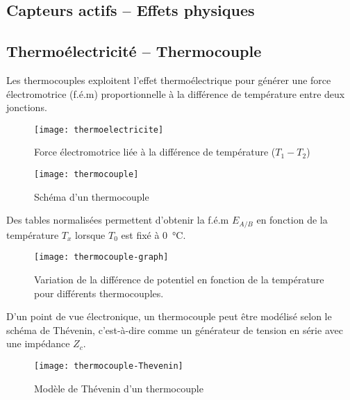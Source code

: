 \subsection*{Capteurs actifs – Effets physiques}

\subsection*{Thermoélectricité – Thermocouple}
Les thermocouples exploitent l'effet thermoélectrique pour générer une force 
électromotrice (f.é.m) proportionnelle à la différence de température entre deux 
jonctions.  

\begin{minipage}{0.49\textwidth}
    \begin{figure}[H]
        \centering
        \texttt{[image: thermoelectricite]}
        \caption{Force électromotrice liée à la différence de température (\(T_1-T_2\))}
        \label{figThermoelectricite}
    \end{figure}
\end{minipage}
\begin{minipage}{0.5\textwidth}
    \begin{figure}[H]
        \centering
        \texttt{[image: thermocouple]}
        \caption{Schéma d'un thermocouple}
        \label{figThermocouple}
    \end{figure}
\end{minipage}

Des tables normalisées permettent d'obtenir la f.é.m $E_{A/B}$ en fonction de la 
température $T_x$ lorsque $T_0$ est fixé à 0~°C.

\begin{figure}[H]
    \centering
    \texttt{[image: thermocouple-graph]}
    \caption{Variation de la différence de potentiel en fonction de la 
    température pour différents thermocouples.}
    \label{figThermocoupleGraph}
\end{figure}

D'un point de vue électronique, un thermocouple peut être modélisé selon le 
schéma de Thévenin, c'est-à-dire comme un générateur de tension en série avec 
une impédance $Z_c$.  

\begin{figure}[H]
    \centering
    \texttt{[image: thermocouple-Thevenin]}
    \caption{Modèle de Thévenin d'un thermocouple}
    \label{figThermocoupleThevenin}    
\end{figure}

